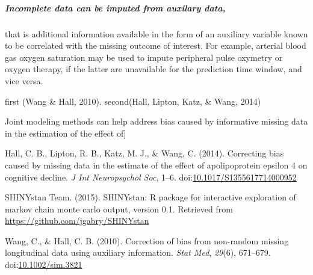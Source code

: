 \documentclass[]{article}
\begin{document}
\subparagraph{Incomplete data can be imputed from auxilary
data,}\label{incomplete-data-can-be-imputed-from-auxilary-data}

that is additional information available in the form of an auxiliary
variable known to be correlated with the missing outcome of interest.
For example, arterial blood gas oxygen saturation may be used to impute
peripheral pulse oxymetry or oxygen therapy, if the latter are
unavailable for the prediction time window, and vice versa.

first (Wang \& Hall, 2010). second(Hall, Lipton, Katz, \& Wang, 2014)

Joint modeling methods can help address bias caused by informative
missing data in the estimation of the effect of{]}

Hall, C. B., Lipton, R. B., Katz, M. J., \& Wang, C. (2014). Correcting
bias caused by missing data in the estimate of the effect of
apolipoprotein epsilon 4 on cognitive decline. \emph{J Int Neuropsychol
Soc}, 1--6.
doi:\href{http://dx.doi.org/10.1017/S1355617714000952}{10.1017/S1355617714000952}

SHINYstan Team. (2015). SHINYstan: R package for interactive exploration
of markov chain monte carlo output, version 0.1. Retrieved from
\url{https://github.com/jgabry/SHINYstan}

Wang, C., \& Hall, C. B. (2010). Correction of bias from non-random
missing longitudinal data using auxiliary information. \emph{Stat Med},
\emph{29}(6), 671--679.
doi:\href{http://dx.doi.org/10.1002/sim.3821}{10.1002/sim.3821}
\end{document}
